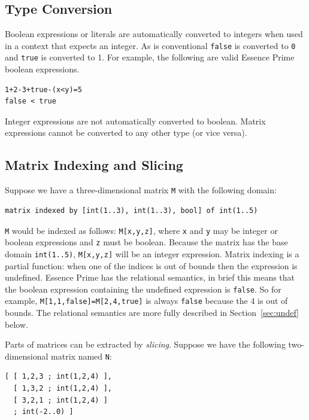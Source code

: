 \documentclass[a4paper]{article}
\newcommand{\eprime}{{\sc Essence Prime}\xspace}
\begin{document}
\subsection{Type Conversion}

Boolean expressions or literals are automatically converted to integers when used
in a context that expects an integer. As is conventional \texttt{false} is converted
to \texttt{0} and \texttt{true} is converted to {1}. For example, the following are 
valid \eprime boolean expressions. 

\begin{verbatim}
1+2-3+true-(x<y)=5
false < true
\end{verbatim}

Integer expressions are not automatically converted to boolean. Matrix expressions
cannot be converted to any other type (or vice versa). 

\subsection{Matrix Indexing and Slicing}\label{sub:matrix-slicing}

Suppose we have a three-dimensional matrix {\tt M} with the following domain:

\begin{verbatim}
matrix indexed by [int(1..3), int(1..3), bool] of int(1..5)
\end{verbatim}

{\tt M} would be indexed as follows: {\tt M[x,y,z]}, where \texttt{x} and \texttt{y} may be integer or
boolean expressions and \texttt{z} must be boolean. Because the matrix has the base
domain \texttt{int(1..5)}, {\tt M[x,y,z]} will be an integer expression. 
Matrix indexing is a partial function: when one of the indices is out of bounds 
then the expression is undefined. \eprime has the relational semantics, 
in brief this means that the boolean expression containing the undefined expression is
\texttt{false}. So for example, \texttt{M[1,1,false]=M[2,4,true]} is always \texttt{false}
because the 4 is out of bounds. The relational semantics are more fully described 
in Section~\ref{sec:undef} below. 

Parts of matrices can be extracted by \textit{slicing}. Suppose we have the 
following two-dimensional matrix named \texttt{N}: 

\begin{verbatim}
[ [ 1,2,3 ; int(1,2,4) ],
  [ 1,3,2 ; int(1,2,4) ],
  [ 3,2,1 ; int(1,2,4) ]
  ; int(-2..0) ]
\end{verbatim}
\end{document}
